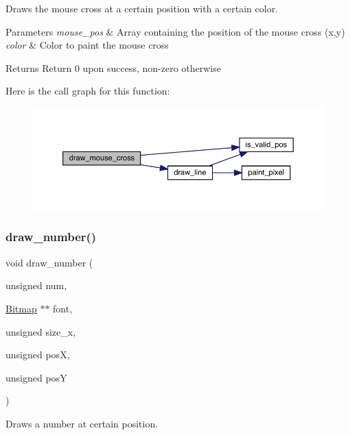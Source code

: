 Draws the mouse cross at a certain position with a certain color. 


\begin{DoxyParams}{Parameters}
{\em mouse\+\_\+pos} & Array containing the position of the mouse cross (x,y) \\
\hline
{\em color} & Color to paint the mouse cross\\
\hline
\end{DoxyParams}
\begin{DoxyReturn}{Returns}
Return 0 upon success, non-\/zero otherwise 
\end{DoxyReturn}
Here is the call graph for this function\+:\nopagebreak
\begin{figure}[H]
\begin{center}
\leavevmode
\includegraphics[width=350pt]{group__video__gr_ga5cb0e000108ddc786148172ee56903c3_cgraph}
\end{center}
\end{figure}
\hypertarget{group__video__gr_ga8dca584eb65462cd691cb94a9ec92602}{}\label{group__video__gr_ga8dca584eb65462cd691cb94a9ec92602} 
\subsubsection{\texorpdfstring{draw\+\_\+number()}{draw\_number()}}
{\footnotesize\ttfamily void draw\+\_\+number (\begin{DoxyParamCaption}\item[{unsigned}]{num,  }\item[{\hyperlink{struct_bitmap}{Bitmap} $\ast$$\ast$}]{font,  }\item[{unsigned}]{size\+\_\+x,  }\item[{unsigned}]{posX,  }\item[{unsigned}]{posY }\end{DoxyParamCaption})}



Draws a number at certain position. 


